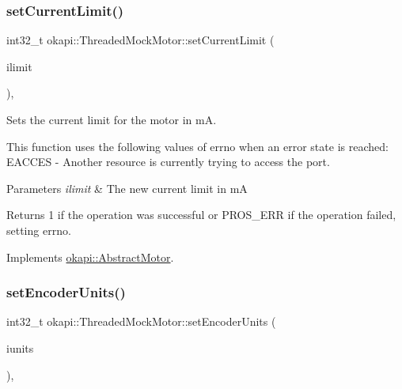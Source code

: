 \subsubsection{\texorpdfstring{setCurrentLimit()}{setCurrentLimit()}}
{\footnotesize\ttfamily int32\+\_\+t okapi\+::\+Threaded\+Mock\+Motor\+::set\+Current\+Limit (\begin{DoxyParamCaption}\item[{std\+::int32\+\_\+t}]{ilimit }\end{DoxyParamCaption})\hspace{0.3cm}{\ttfamily [override]}, {\ttfamily [virtual]}}



Sets the current limit for the motor in mA. 

This function uses the following values of errno when an error state is reached\+: E\+A\+C\+C\+ES -\/ Another resource is currently trying to access the port.


\begin{DoxyParams}{Parameters}
{\em ilimit} & The new current limit in mA \\
\hline
\end{DoxyParams}
\begin{DoxyReturn}{Returns}
1 if the operation was successful or P\+R\+O\+S\+\_\+\+E\+RR if the operation failed, setting errno. 
\end{DoxyReturn}


Implements \mbox{\hyperlink{classokapi_1_1AbstractMotor_aec97c81f3d6604363ebc8ceaf425fe39}{okapi\+::\+Abstract\+Motor}}.

\mbox{\label{classokapi_1_1ThreadedMockMotor_a34c1e91ed83b0dc293a5ed0478f4d28d}} 
\subsubsection{\texorpdfstring{setEncoderUnits()}{setEncoderUnits()}}
{\footnotesize\ttfamily int32\+\_\+t okapi\+::\+Threaded\+Mock\+Motor\+::set\+Encoder\+Units (\begin{DoxyParamCaption}\item[{\mbox{\hyperlink{classokapi_1_1AbstractMotor_ae811cd825099f2defadeb1b7f7e7764c}{encoder\+Units}}}]{iunits }\end{DoxyParamCaption})\hspace{0.3cm}{\ttfamily [override]}, {\ttfamily [virtual]}}



